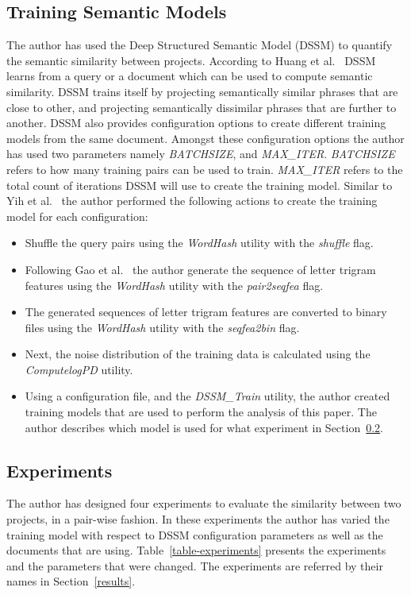 \documentclass[conference]{IEEEtran}
\begin{document}
\subsection{Training Semantic Models}
\label{train_dssm}
The author has used the Deep Structured Semantic Model (DSSM) to quantify the semantic similarity between projects. According to Huang et al.~\cite{Huang:CIKM} DSSM learns from a query or a document which can be used to compute semantic similarity. DSSM trains itself by projecting semantically similar phrases that are close to other, and projecting semantically dissimilar phrases that are further to another. 
DSSM also provides configuration options to create different training models from the same document. Amongst these configuration options the author has used two parameters namely \textit{BATCHSIZE}, and \textit{MAX\_ITER}. \textit{BATCHSIZE} refers to how many training pairs can be used to train. \textit{MAX\_ITER} refers to the total count of iterations DSSM will use to create the training model.            
Similar to Yih et al.~\cite{wen:yih:semantic:parsing} the author performed the following actions to create the training model for each configuration: 
\begin{itemize}
\item{Shuffle the query pairs using the \textit{WordHash} utility with the \textit{shuffle} flag. }
\item{Following Gao et al.~\cite{gao:interesting:emnlp} the author generate the sequence of letter trigram features using the \textit{WordHash} utility with the \textit{pair2seqfea} flag. }
\item{The generated sequences of letter trigram features are converted to binary files using the \textit{WordHash} utility with the \textit{seqfea2bin} flag. }
\item{Next, the noise distribution of the training data is calculated using the \textit{ComputelogPD} utility.}
\item{Using a configuration file, and the \textit{DSSM\_Train} utility, the author created training models that are used to perform the analysis of this paper. The author describes which model is used for what experiment in Section~\ref{exp}.}
\end{itemize}

\subsection{Experiments}
\label{exp}
The author has designed four experiments to evaluate the similarity between two projects, in a pair-wise fashion. In these experiments the author has varied the training model with respect to DSSM configuration parameters as well as the documents that are using. Table~\ref{table-experiments} presents the experiments and the parameters that were changed. The experiments are referred by their names in Section~\ref{results}. 
\end{document}
